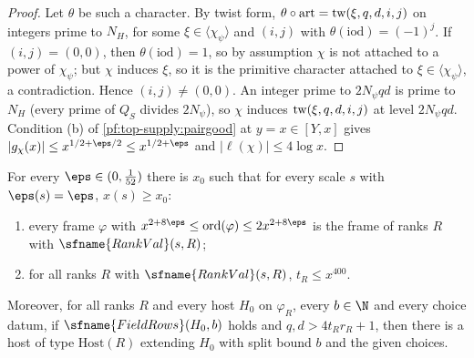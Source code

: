 \begin{proof}
Let $\theta$ be such a character. By twist form, $\theta\circ\mathrm{art}=\operatorname{tw}(\xi,q,d,i,j)$ on integers prime to
$N_H$, for some $\xi\in\langle\chi_\psi\rangle$ and $(i,j)$ with $\theta(\mathrm{iod})=(-1)^j$. If $(i,j)=(0,0)$, then
$\theta(\mathrm{iod})=1$, so by assumption $\chi$ is not attached to a power of $\chi_\psi$; but $\chi$ induces $\xi$, so it
is the primitive character attached to $\xi\in\langle\chi_\psi\rangle$, a contradiction. Hence $(i,j)\ne(0,0)$. An integer
prime to $2N_\psi qd$ is prime to
$N_H$ (every prime of $Q_S$ divides $2N_\psi$), so $\chi$ induces $\operatorname{tw}(\xi,q,d,i,j)$ at level $2N_\psi qd$.
Condition (b) of \cref{pf:top-supply:pairgood} at $y=x\in[Y,x]$ gives $|g_\chi(x)|\le x^{1/2+\eps/2}\le x^{1/2+\eps}$ and
$|\ell(\chi)|\le4\log x$.
\end{proof}

\begin{lemma}[Ranks]\label{pf:top-supply:ranks}
For every $\eps\in(0,\frac1{52})$ there is $x_0$ such that for every scale $s$ with $\eps(s)=\eps$, $x(s)\ge x_0$:
\begin{enumerate}[label=(\roman*)]
\item every frame $\varphi$ with $x^{2+8\eps}\le\mathrm{ord}(\varphi)\le2x^{2+8\eps}$ is the frame of ranks $R$ with
$\sfname{RankVal}(s,R)$;
\item for all ranks $R$ with $\sfname{RankVal}(s,R)$, $t_R\le x^{400}$.
\end{enumerate}
Moreover, for all ranks $R$ and every host $H_0$ on $\varphi_R$, every $b\in\N$ and every choice datum, if
$\sfname{FieldRows}(H_0,b)$ holds and $q,d>4t_Rr_R+1$, then there is a host of type $\mathrm{Host}(R)$ extending $H_0$ with
split bound $b$ and the given choices.
 
 
\end{lemma}


